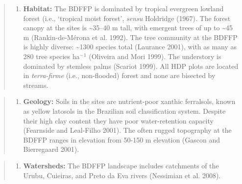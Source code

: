 \documentclass[
  12pt,
  man, donotrepeattitle,floatsintext]{apa6}
\providecommand{\tightlist}{%
  \setlength{\itemsep}{0pt}\setlength{\parskip}{0pt}}
\begin{document}
\begin{quote}
\begin{enumerate}
\def\labelenumi{\alph{enumi}.}
\setcounter{enumi}{2}
\tightlist
\item
  \textbf{Habitat:} The BDFFP is dominated by tropical evergreen lowland forest (i.e., `tropical moist forest', \emph{sensu} Holdridge (1967). The forest canopy at the sites is \textasciitilde35--40 m tall, with emergent trees of up to \textasciitilde45 m (Rankin-de-Mérona et al. 1992). The tree community at the BDFFP is highly diverse: \textasciitilde1300 species total (Laurance 2001), with as many as 280 tree species ha\(^-\)\(^1\) (Oliveira and Mori 1999). The understory is dominated by stemless palms (Scariot 1999). All HDP plots are located in \emph{terra-firme} (i.e., non-flooded) forest and none are bisected by streams.
\end{enumerate}
\end{quote}

\begin{quote}
\begin{enumerate}
\def\labelenumi{\alph{enumi}.}
\setcounter{enumi}{3}
\tightlist
\item
  \textbf{Geology:} Soils in the sites are nutrient-poor xanthic ferralsols, known as yellow latosols in the Brazilian soil classification system. Despite their high clay content they have poor water-retention capacity (Fearnside and Leal-Filho 2001). The often rugged topography at the BDFFP ranges in elevation from 50-150 m elevation (Gascon and Bierregaard 2001).
\end{enumerate}
\end{quote}

\begin{quote}
\begin{enumerate}
\def\labelenumi{\alph{enumi}.}
\setcounter{enumi}{4}
\tightlist
\item
  \textbf{Watersheds:} The BDFFP landscape includes catchments of the Urubu, Cuieiras, and Preto da Eva rivers (Nessimian et al. 2008).
\end{enumerate}
\end{quote}
\end{document}
